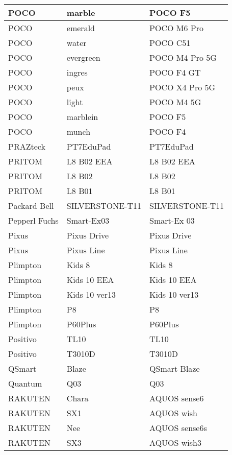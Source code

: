 \begin{tabularx}{\linewidth}{|l|X|X|}
        POCO & marble & POCO F5 \\ \hline
        POCO & emerald & POCO M6 Pro \\ \hline
        POCO & water & POCO C51 \\ \hline
        POCO & evergreen & POCO M4 Pro 5G \\ \hline
        POCO & ingres & POCO F4 GT \\ \hline
        POCO & peux & POCO X4 Pro 5G \\ \hline
        POCO & light & POCO M4 5G \\ \hline
        POCO & marblein & POCO F5 \\ \hline
        POCO & munch & POCO F4 \\ \hline
        PRAZteck & PT7EduPad & PT7EduPad \\ \hline
        PRITOM & L8 B02 EEA & L8 B02 EEA \\ \hline
        PRITOM & L8 B02 & L8 B02 \\ \hline
        PRITOM & L8 B01 & L8 B01 \\ \hline
        Packard Bell & SILVERSTONE-T11 & SILVERSTONE-T11 \\ \hline
        Pepperl Fuchs & Smart-Ex03 & Smart-Ex 03 \\ \hline
        Pixus & Pixus Drive & Pixus Drive \\ \hline
        Pixus & Pixus Line & Pixus Line \\ \hline
        Plimpton & Kids 8 & Kids 8 \\ \hline
        Plimpton & Kids 10 EEA & Kids 10 EEA \\ \hline
        Plimpton & Kids 10 ver13 & Kids 10 ver13 \\ \hline
        Plimpton & P8 & P8 \\ \hline
        Plimpton & P60Plus & P60Plus \\ \hline
        Positivo & TL10 & TL10 \\ \hline
        Positivo & T3010D & T3010D \\ \hline
        QSmart & Blaze & QSmart Blaze \\ \hline
        Quantum & Q03 & Q03 \\ \hline
        RAKUTEN & Chara & AQUOS sense6 \\ \hline
        RAKUTEN & SX1 & AQUOS wish \\ \hline
        RAKUTEN & Nee & AQUOS sense6s \\ \hline
        RAKUTEN & SX3 & AQUOS wish3 \\ \hline

\end{tabularx}
